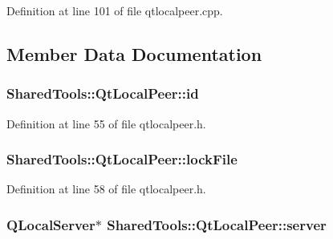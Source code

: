 Definition at line 101 of file qtlocalpeer.\-cpp.



\subsection{Member Data Documentation}
\hypertarget{class_shared_tools_1_1_qt_local_peer_a1f082b2662b8ee979cc98c60e1cd8d68}{
\subsubsection[{id}]{ Shared\-Tools\-::\-Qt\-Local\-Peer\-::id\hspace{0.3cm}{\ttfamily [protected]}}}\label{class_shared_tools_1_1_qt_local_peer_a1f082b2662b8ee979cc98c60e1cd8d68}


Definition at line 55 of file qtlocalpeer.\-h.

\hypertarget{class_shared_tools_1_1_qt_local_peer_ae6449b9b702fc14082d81852343df092}{
\subsubsection[{lock\-File}]{ Shared\-Tools\-::\-Qt\-Local\-Peer\-::lock\-File\hspace{0.3cm}{\ttfamily [protected]}}}\label{class_shared_tools_1_1_qt_local_peer_ae6449b9b702fc14082d81852343df092}


Definition at line 58 of file qtlocalpeer.\-h.

\hypertarget{class_shared_tools_1_1_qt_local_peer_ae390a08e30f9c83e2a4b88eaf19a73ba}{
\subsubsection[{server}]{\setlength{\rightskip}{0pt plus 5cm}Q\-Local\-Server$\ast$ Shared\-Tools\-::\-Qt\-Local\-Peer\-::server\hspace{0.3cm}{\ttfamily [protected]}}}\label{class_shared_tools_1_1_qt_local_peer_ae390a08e30f9c83e2a4b88eaf19a73ba}


